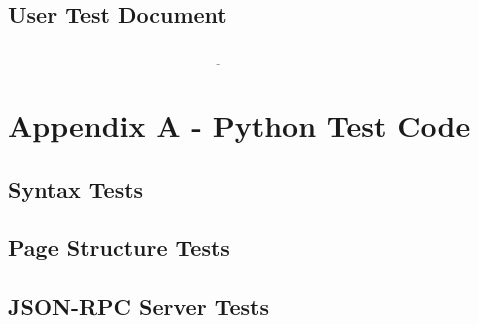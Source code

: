 \documentclass[10pt]{article}
\begin{document}
\subsection*{User Test Document}
\begin{center}
$\underline{\hspace{5in}}$
\end{center}



\newpage

\section*{Appendix A - Python Test Code}

\subsection*{Syntax Tests}



\newpage

\subsection*{Page Structure Tests}



\newpage

\subsection*{JSON-RPC Server Tests}


\end{document}
